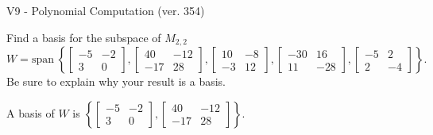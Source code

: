 \begin{exercise}
  \begin{exerciseTitle}V9 - Polynomial Computation (ver. 354)\end{exerciseTitle}
  \begin{exerciseStatement}
    Find a basis for the subspace of \(M_{2,2}\) 
\[W=\mathrm{span}\ \left\{\left[\begin{array}{cc}
-5 & -2 \\
3 & 0
\end{array}\right] , \left[\begin{array}{cc}
40 & -12 \\
-17 & 28
\end{array}\right] , \left[\begin{array}{cc}
10 & -8 \\
-3 & 12
\end{array}\right] , \left[\begin{array}{cc}
-30 & 16 \\
11 & -28
\end{array}\right] , \left[\begin{array}{cc}
-5 & 2 \\
2 & -4
\end{array}\right]\right\}.\]
 Be sure to explain why your result is a basis.


  \end{exerciseStatement}
  \begin{exerciseAnswer}
   A basis of \(W\) is  \(\left\{\left[\begin{array}{cc}
-5 & -2 \\
3 & 0
\end{array}\right] , \left[\begin{array}{cc}
40 & -12 \\
-17 & 28
\end{array}\right]\right\}\).
  


  \end{exerciseAnswer}
\end{exercise}